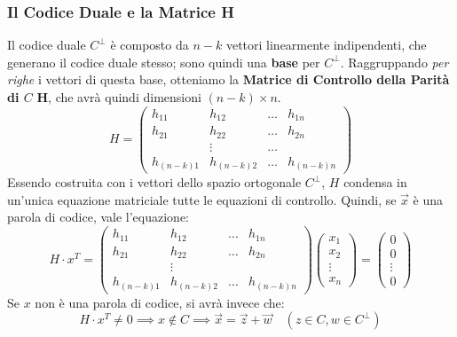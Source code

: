 \subsubsection{Il Codice Duale e la Matrice H}
Il codice duale $C^\perp$ è composto da $n-k$ vettori linearmente indipendenti, che generano il codice duale stesso; sono quindi una \textbf{base} per $C^\perp$. 
Raggruppando \textit{per righe} i vettori di questa base, otteniamo la \textbf{Matrice di Controllo della Parità di $C$} $\mathbf{H}$, che avrà quindi dimensioni $(n-k) \times n$.
\begin{equation*}
H = 
\begin{pmatrix}
    h_{11} & h_{12} & \dots  & h_{1n} \\
    h_{21} & h_{22} & \dots  & h_{2n} \\
           & \vdots & \dots  &        \\
    h_{(n-k)1} & h_{(n-k)2} & \dots  & h_{(n-k)n}
\end{pmatrix}
\end{equation*}
Essendo costruita con i vettori dello spazio ortogonale $C^\perp$, $H$ condensa in un'unica equazione matriciale tutte le equazioni di controllo. Quindi, se $\vec{x}$ è una parola di codice, vale l'equazione:
\begin{equation*}
H \cdot x^T = 
\begin{pmatrix}
    h_{11} & h_{12} & \dots  & h_{1n} \\
    h_{21} & h_{22} & \dots  & h_{2n} \\
           & \vdots &        &        \\
    h_{(n-k)1} & h_{(n-k)2} & \dots  & h_{(n-k)n}
\end{pmatrix}
\begin{pmatrix}
    x_1 \\
    x_2 \\
    \vdots \\
    x_n
\end{pmatrix} = 
\begin{pmatrix}
    0 \\
    0 \\
    \vdots \\
    0
\end{pmatrix}
\end{equation*}
Se $x$ non è una parola di codice, si avrà invece che:
\[H \cdot x^T \neq 0 \implies x \notin C \implies \vec{x} = \vec{z}+ \vec{w} \quad (z \in C, w \in C^\perp)\]

